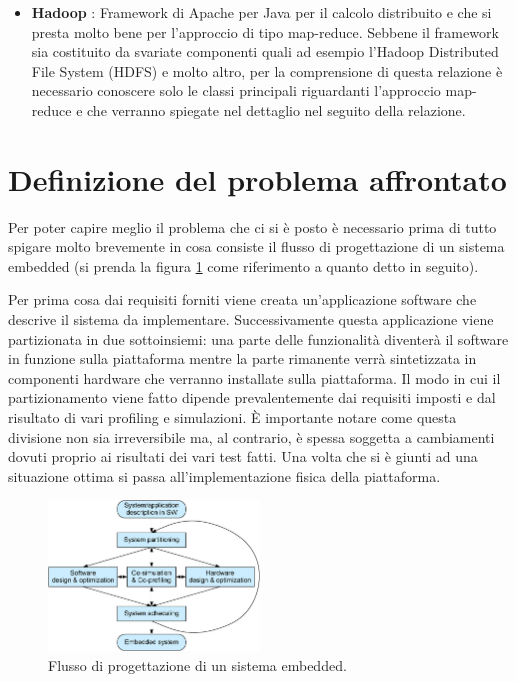 \documentclass[]{IEEEtran}
\begin{document}
\begin{itemize}
	\item \textbf{Hadoop} \cite{HADOOP}: Framework di Apache per Java per il calcolo distribuito e che si presta molto bene per l'approccio di tipo map-reduce. Sebbene il framework sia costituito da svariate componenti quali ad esempio l'Hadoop Distributed File System (HDFS) e molto altro, per la comprensione di questa relazione è necessario conoscere solo le classi principali riguardanti l'approccio map-reduce e che verranno spiegate nel dettaglio nel seguito della relazione.
\end{itemize}

\section{Definizione del problema affrontato}
Per poter capire meglio il problema che ci si è posto è necessario prima di tutto spigare molto brevemente in cosa consiste il flusso di progettazione di un sistema embedded (si prenda la figura \ref{pse} come riferimento a quanto detto in seguito).

Per prima cosa  dai requisiti forniti viene creata un'applicazione software che descrive il sistema da implementare. Successivamente questa applicazione viene partizionata in due sottoinsiemi: una parte delle funzionalità diventerà il software in funzione sulla piattaforma mentre la parte rimanente verrà sintetizzata in componenti hardware che verranno installate sulla piattaforma. Il modo in cui il partizionamento viene fatto dipende prevalentemente dai requisiti imposti e dal risultato di vari profiling e simulazioni. È importante notare come questa divisione non sia irreversibile ma, al contrario, è spessa soggetta a cambiamenti dovuti proprio ai risultati dei vari test fatti. Una volta che si è giunti ad una situazione ottima si passa all'implementazione fisica della piattaforma.
\begin{figure}[htp]
	\centering
	\includegraphics[width=0.5\textwidth]{images/embedded_sys_df.png}
	\caption{Flusso di progettazione di un sistema embedded.}
	\label{pse}
\end{figure}
\end{document}

